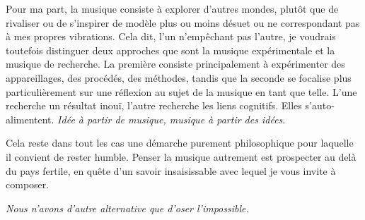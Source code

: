 \documentclass{article}
\begin{document}
Pour ma part, la musique consiste à explorer d'autres mondes, plutôt que de rivaliser ou de s'inspirer de modèle plus ou moins désuet ou ne correspondant pas à mes propres vibrations. Cela dit, l'un n'empêchant pas l'autre, je voudrais toutefois distinguer deux approches que sont la musique expérimentale et la musique de recherche. La première consiste principalement à expérimenter des appareillages, des procédés, des méthodes, tandis que la seconde se focalise plus particulièrement sur une réflexion au sujet de la musique en tant que telle. L'une recherche un résultat inouï, l'autre recherche les liens cognitifs. Elles s'auto-alimentent. \textit{Idée à partir de musique, musique à partir des idées}.

Cela reste dans tout les cas une démarche purement philosophique pour laquelle il convient de rester humble. Penser la musique autrement est prospecter au delà du pays fertile, en quête d’un savoir insaisissable avec lequel je vous invite à composer. 

\bigskip

\textit{Nous n’avons d’autre alternative que d’oser l’impossible.}
\end{document}
